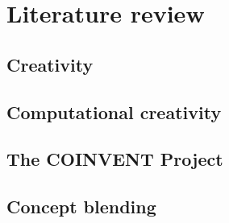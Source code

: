 
\chapter{Literature review} %

\label{Chapter3} %


\section{Creativity}


\section{Computational creativity}


\section{The COINVENT Project}


\section{Concept blending}

